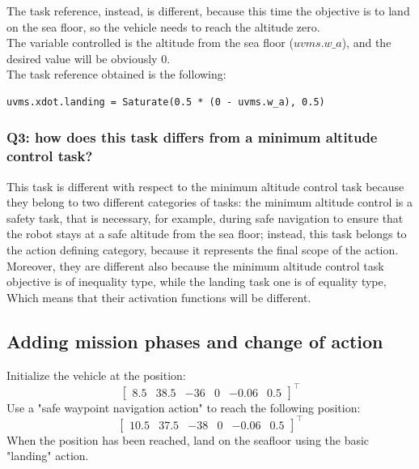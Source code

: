\documentclass{article}
\begin{document}
The task reference, instead, is different, because this time the objective is to land on the sea floor, so the vehicle needs to reach the altitude zero.\\ 
The variable controlled is the altitude from the sea floor (\(uvms.w\_a\)), and the desired value will be obviously 0.\\
The task reference obtained is the following:
\begin{lstlisting}
uvms.xdot.landing = Saturate(0.5 * (0 - uvms.w_a), 0.5) 
\end{lstlisting}

\subsubsection{Q3: how does this task differs from a minimum altitude control task?}
This task is different with respect to the minimum altitude control task because they belong to two different categories of tasks: the minimum altitude control is a safety task, that is necessary, for example, during safe navigation to ensure that the robot stays at a safe altitude from the sea floor; instead, this task belongs to the action defining category, because it represents the final scope of the action.\\
Moreover, they are different also because the minimum altitude control task objective is of inequality type, while the landing task one is of equality type, Which means that their activation functions will be different.

\subsection{Adding mission phases and change of action}
Initialize the vehicle at the position:
\begin{displaymath}
\begin{bmatrix} 8.5 & 38.5 & -36 & 0 & -0.06 & 0.5 \end{bmatrix}^\top
\end{displaymath}
Use a "safe waypoint navigation action" to reach the following position:
\begin{displaymath}
\begin{bmatrix} 10.5 & 37.5 & -38 & 0 & -0.06 & 0.5 \end{bmatrix}^\top
\end{displaymath}
When the position has been reached, land on the seafloor using the basic "landing" action.
\end{document}
